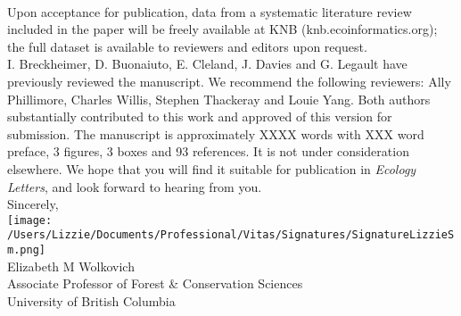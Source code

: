 \documentclass[12pt,a4paper]{letter}
\begin{document}
\begin{letter}{}
\vspace{1.5ex}\\
Upon acceptance for publication, data from a systematic literature review included in the paper will be freely available at KNB (knb.ecoinformatics.org); the full dataset is available to reviewers and editors upon request. %
\vspace{1.5ex}\\
I. Breckheimer, D. Buonaiuto, E. Cleland, J. Davies and G. Legault have previously reviewed the manuscript. We recommend the following reviewers: Ally Phillimore, Charles Willis, Stephen Thackeray and Louie Yang.  Both authors substantially contributed to this work and approved of this version for submission. The manuscript is approximately XXXX words with XXX word preface, 3 figures, 3 boxes and 93 references. It is not under consideration elsewhere. We hope that you will find it suitable for publication in \emph{Ecology Letters}, and look forward to hearing from you.
\vspace{1.5ex}\\
Sincerely,\\

\texttt{[image: /Users/Lizzie/Documents/Professional/Vitas/Signatures/SignatureLizzieSm.png]} \\

Elizabeth M Wolkovich\\
Associate Professor of Forest \& Conservation Sciences\\ 
University of British Columbia
\end{letter}
\end{document}
